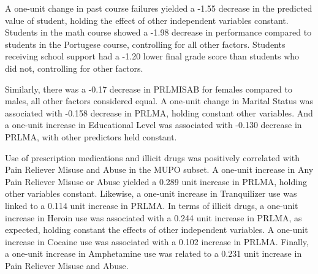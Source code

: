 \documentclass[sigconf]{acmart}
\begin{document}
A one-unit change in past course failures yielded a -1.55 decrease in the 
predicted value of student, holding the effect of other independent variables 
constant. Students in the math course showed a -1.98 decrease in performance 
compared to students in the Portugese course, controlling for all other factors.
Students receiving school support had a -1.20 lower final grade score than 
students who did not, controlling for other factors.



Similarly, there was a -0.17 decrease in PRLMISAB 
for females compared to males, all other factors considered equal. A one-unit 
change in Marital Status was associated with -0.158 decrease in PRLMA, holding
constant other variables. And a one-unit increase in Educational Level was 
associated with -0.130 decrease in PRLMA, with other predictors held constant. 

Use of prescription medications and illicit drugs was positively correlated with 
Pain Reliever Misuse and Abuse in the MUPO subset. A one-unit increase in Any 
Pain Reliever Misuse or Abuse yielded a 0.289 unit increase in PRLMA, holding 
other variables constant. Likewise, a one-unit increase in Tranquilizer use was 
linked to a 0.114 unit increase in PRLMA. In terms of illicit drugs, a one-unit 
increase in Heroin use was associated with a 0.244 unit increase in PRLMA, as 
expected, holding constant the effects of other independent variables. 
A one-unit increase in Cocaine use was associated with a 0.102 increase in PRLMA. 
Finally, a one-unit increase in Amphetamine use was related to a 0.231 unit 
increase in Pain Reliever Misuse and Abuse.  
\end{document}
